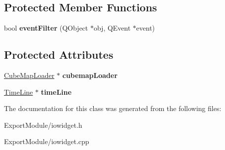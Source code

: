 \subsection*{\-Protected \-Member \-Functions}
\begin{DoxyCompactItemize}
\item 
\hypertarget{class_i_o_widget_ac1fb6467d640bdc2aa2e6baf956e49ae}{
bool {\bfseries event\-Filter} (\-Q\-Object $\ast$obj, \-Q\-Event $\ast$event)}
\label{class_i_o_widget_ac1fb6467d640bdc2aa2e6baf956e49ae}

\end{DoxyCompactItemize}
\subsection*{\-Protected \-Attributes}
\begin{DoxyCompactItemize}
\item 
\hypertarget{class_i_o_widget_a7f6de3012e9bcb21867c64eaf6fce833}{
\hyperlink{class_cube_map_loader}{\-Cube\-Map\-Loader} $\ast$ {\bfseries cubemap\-Loader}}
\label{class_i_o_widget_a7f6de3012e9bcb21867c64eaf6fce833}

\item 
\hypertarget{class_i_o_widget_a6da18b07074d97a9fe6a82de9dc86ba0}{
\hyperlink{class_time_line}{\-Time\-Line} $\ast$ {\bfseries time\-Line}}
\label{class_i_o_widget_a6da18b07074d97a9fe6a82de9dc86ba0}

\end{DoxyCompactItemize}


\-The documentation for this class was generated from the following files\-:\begin{DoxyCompactItemize}
\item 
\-Export\-Module/iowidget.\-h\item 
\-Export\-Module/iowidget.\-cpp\end{DoxyCompactItemize}
